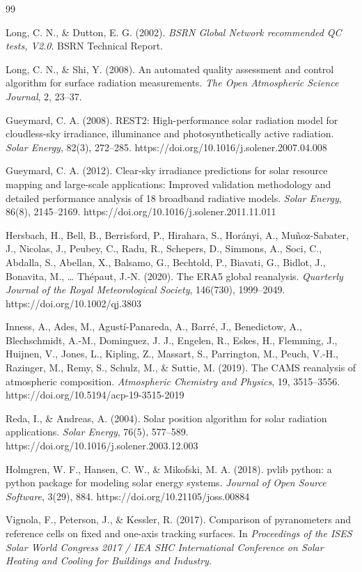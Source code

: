 \documentclass[../main.tex]{subfiles}
\begin{document}
\newpage

\begin{thebibliography}{99}

Long, C. N., \& Dutton, E. G. (2002).
\textit{BSRN Global Network recommended QC tests, V2.0}.
BSRN Technical Report.

Long, C. N., \& Shi, Y. (2008).
An automated quality assessment and control algorithm for surface radiation measurements.
\textit{The Open Atmospheric Science Journal}, 2, 23--37.

Gueymard, C. A. (2008).
REST2: High-performance solar radiation model for cloudless-sky irradiance, illuminance and photosynthetically active radiation.
\textit{Solar Energy}, 82(3), 272--285.
https://doi.org/10.1016/j.solener.2007.04.008

Gueymard, C. A. (2012).
Clear-sky irradiance predictions for solar resource mapping and large-scale applications: Improved validation methodology and detailed performance analysis of 18 broadband radiative models.
\textit{Solar Energy}, 86(8), 2145--2169.
https://doi.org/10.1016/j.solener.2011.11.011

Hersbach, H., Bell, B., Berrisford, P., Hirahara, S., Horányi, A., Muñoz-Sabater, J., Nicolas, J., Peubey, C., Radu, R., Schepers, D., Simmons, A., Soci, C., Abdalla, S., Abellan, X., Balsamo, G., Bechtold, P., Biavati, G., Bidlot, J., Bonavita, M., \ldots{} Thépaut, J.-N. (2020).
The ERA5 global reanalysis.
\textit{Quarterly Journal of the Royal Meteorological Society}, 146(730), 1999--2049.
https://doi.org/10.1002/qj.3803

Inness, A., Ades, M., Agustí-Panareda, A., Barré, J., Benedictow, A., Blechschmidt, A.-M., Dominguez, J. J., Engelen, R., Eskes, H., Flemming, J., Huijnen, V., Jones, L., Kipling, Z., Massart, S., Parrington, M., Peuch, V.-H., Razinger, M., Remy, S., Schulz, M., \& Suttie, M. (2019).
The CAMS reanalysis of atmospheric composition.
\textit{Atmospheric Chemistry and Physics}, 19, 3515--3556.
https://doi.org/10.5194/acp-19-3515-2019

Reda, I., \& Andreas, A. (2004).
Solar position algorithm for solar radiation applications.
\textit{Solar Energy}, 76(5), 577--589.
https://doi.org/10.1016/j.solener.2003.12.003

Holmgren, W. F., Hansen, C. W., \& Mikofski, M. A. (2018).
pvlib python: a python package for modeling solar energy systems.
\textit{Journal of Open Source Software}, 3(29), 884.
https://doi.org/10.21105/joss.00884

Vignola, F., Peterson, J., \& Kessler, R. (2017).
Comparison of pyranometers and reference cells on fixed and one-axis tracking surfaces.
In \textit{Proceedings of the ISES Solar World Congress 2017 / IEA SHC International Conference on Solar Heating and Cooling for Buildings and Industry}.
\end{thebibliography}
\end{document}
